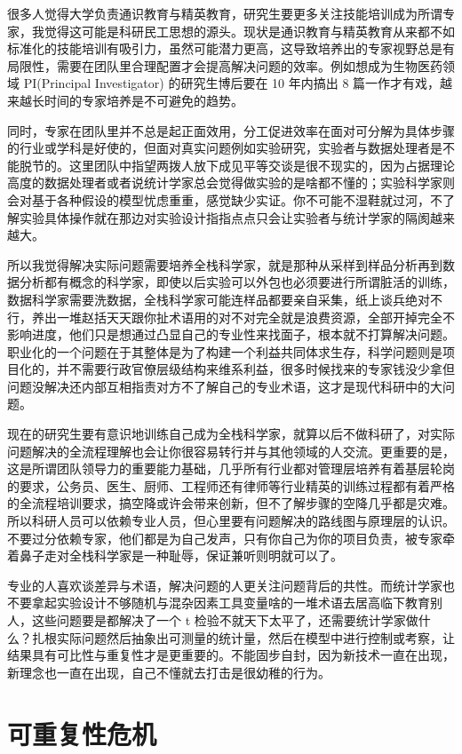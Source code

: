 \documentclass[]{tufte-book}
\begin{document}
很多人觉得大学负责通识教育与精英教育，研究生要更多关注技能培训成为所谓专家，我觉得这可能是科研民工思想的源头。现状是通识教育与精英教育从来都不如标准化的技能培训有吸引力，虽然可能潜力更高，这导致培养出的专家视野总是有局限性，需要在团队里合理配置才会提高解决问题的效率。例如想成为生物医药领域 PI(Principal Investigator) 的研究生博后要在 10 年内搞出 8 篇一作才有戏，越来越长时间的专家培养是不可避免的趋势。

同时，专家在团队里并不总是起正面效用，分工促进效率在面对可分解为具体步骤的行业或学科是好使的，但面对真实问题例如实验研究，实验者与数据处理者是不能脱节的。这里团队中指望两拨人放下成见平等交谈是很不现实的，因为占据理论高度的数据处理者或者说统计学家总会觉得做实验的是啥都不懂的；实验科学家则会对基于各种假设的模型忧虑重重，感觉缺少实证。你不可能不湿鞋就过河，不了解实验具体操作就在那边对实验设计指指点点只会让实验者与统计学家的隔阂越来越大。

所以我觉得解决实际问题需要培养全栈科学家，就是那种从采样到样品分析再到数据分析都有概念的科学家，即使以后实验可以外包也必须要进行所谓脏活的训练，数据科学家需要洗数据，全栈科学家可能连样品都要亲自采集，纸上谈兵绝对不行，养出一堆赵括天天跟你扯术语用的对不对完全就是浪费资源，全部开掉完全不影响进度，他们只是想通过凸显自己的专业性来找面子，根本就不打算解决问题。职业化的一个问题在于其整体是为了构建一个利益共同体求生存，科学问题则是项目化的，并不需要行政官僚层级结构来维系利益，很多时候找来的专家钱没少拿但问题没解决还内部互相指责对方不了解自己的专业术语，这才是现代科研中的大问题。

现在的研究生要有意识地训练自己成为全栈科学家，就算以后不做科研了，对实际问题解决的全流程理解也会让你很容易转行并与其他领域的人交流。更重要的是，这是所谓团队领导力的重要能力基础，几乎所有行业都对管理层培养有着基层轮岗的要求，公务员、医生、厨师、工程师还有律师等行业精英的训练过程都有着严格的全流程培训要求，搞空降或许会带来创新，但不了解步骤的空降几乎都是灾难。所以科研人员可以依赖专业人员，但心里要有问题解决的路线图与原理层的认识。不要过分依赖专家，他们都是为自己发声，只有你自己为你的项目负责，被专家牵着鼻子走对全栈科学家是一种耻辱，保证兼听则明就可以了。

专业的人喜欢谈差异与术语，解决问题的人更关注问题背后的共性。而统计学家也不要拿起实验设计不够随机与混杂因素工具变量啥的一堆术语去居高临下教育别人，这些问题要是都解决了一个 t 检验不就天下太平了，还需要统计学家做什么？扎根实际问题然后抽象出可测量的统计量，然后在模型中进行控制或考察，让结果具有可比性与重复性才是更重要的。不能固步自封，因为新技术一直在出现，新理念也一直在出现，自己不懂就去打击是很幼稚的行为。

\hypertarget{ux53efux91cdux590dux6027ux5371ux673a}{%
\section{可重复性危机}\label{ux53efux91cdux590dux6027ux5371ux673a}}
\end{document}
